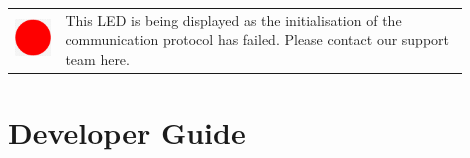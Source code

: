 \begin{tabular}{ m{0.1\linewidth} m{0.8\linewidth} }
				\vspace{2em}
				\includegraphics[width=0.5\linewidth]{graphics/red_circle.png}
				
				& This LED is being displayed as the initialisation of the communication protocol has failed. Please contact our support team here. \\
				 
			\end{tabular}

	\section{Developer Guide}
	\label{sec:developer_guide}




	






